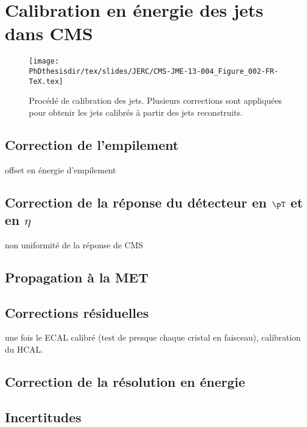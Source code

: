\section{Calibration en énergie des jets dans CMS}

\begin{figure}[h]
\centering
\texttt{[image: \\PhDthesisdir/tex/slides/JERC/CMS-JME-13-004\_Figure\_002-FR-TeX.tex]}
\caption{Procédé de calibration des jets. Plusieurs corrections sont appliquées pour obtenir les jets calibrés à partir des jets reconstruits.}
\label{fig-CMS-JME-13-004_Figure_002-FR-TeX}
\end{figure}

\subsection{Correction de l'empilement}
offset en énergie d'empilement

\subsection{Correction de la réponse du détecteur en $\pT$ et en $\eta$}
non uniformité de la réponse de CMS

\subsection{Propagation à la MET}

\subsection{Corrections résiduelles}
une fois le ECAL calibré (test de presque chaque cristal en faisceau), calibration du HCAL.

\subsection{Correction de la résolution en énergie}

\subsection{Incertitudes}